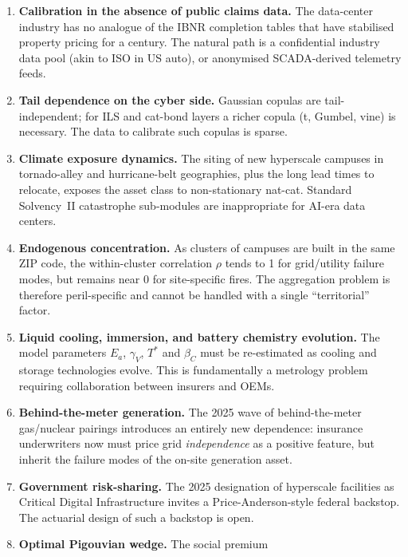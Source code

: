 \documentclass[11pt,a4paper]{article}
\theoremstyle{ia}
\newcommand{\1}{\mathbf{1}}
\begin{document}
\begin{enumerate}[leftmargin=*,nosep]
  \item \textbf{Calibration in the absence of public claims data.}
        The data-center industry has no analogue of the IBNR
        completion tables that have stabilised property pricing for
        a century. The natural path is a confidential industry data
        pool (akin to ISO in US auto), or anonymised SCADA-derived
        telemetry feeds.
  \item \textbf{Tail dependence on the cyber side.} Gaussian copulas
        are tail-independent; for ILS and cat-bond layers a richer
        copula (t, Gumbel, vine) is necessary. The data to calibrate
        such copulas is sparse.
  \item \textbf{Climate exposure dynamics.} The siting of new
        hyperscale campuses in tornado-alley and hurricane-belt
        geographies, plus the long lead times to relocate, exposes
        the asset class to non-stationary nat-cat. Standard
        Solvency~II catastrophe sub-modules are inappropriate for
        AI-era data centers.
  \item \textbf{Endogenous concentration.} As clusters of campuses are
        built in the same ZIP code, the within-cluster correlation
        $\rho$ tends to 1 for grid/utility failure modes, but
        remains near 0 for site-specific fires. The aggregation
        problem is therefore peril-specific and cannot be handled
        with a single ``territorial'' factor.
  \item \textbf{Liquid cooling, immersion, and battery chemistry
        evolution.} The model parameters $E_a$, $\gamma_V$, $T^*$
        and $\beta_C$ must be re-estimated as cooling and storage
        technologies evolve. This is fundamentally a metrology
        problem requiring collaboration between insurers and OEMs.
  \item \textbf{Behind-the-meter generation.} The 2025 wave of
        behind-the-meter gas/nuclear pairings introduces an entirely
        new dependence: insurance underwriters now must price grid
        \emph{independence} as a positive feature, but inherit the
        failure modes of the on-site generation asset.
  \item \textbf{Government risk-sharing.} The 2025 designation of
        hyperscale facilities as Critical Digital Infrastructure
        invites a Price-Anderson-style federal backstop. The
        actuarial design of such a backstop is open.
  \item \textbf{Optimal Pigouvian wedge.} The social premium

\end{enumerate}
\end{document}

